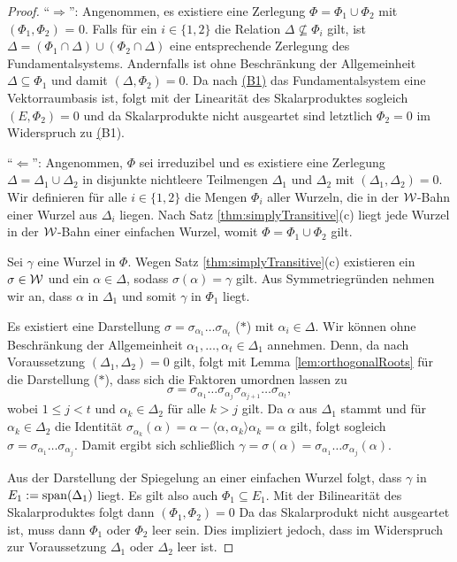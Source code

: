 \begin{proof}
  ``$\Rightarrow$'':
  Angenommen, es existiere eine Zerlegung $\Phi = \Phi_1 \cup \Phi_2$ mit $(\Phi_1, \Phi_2)$ = 0.
  Falls für ein $i \in \{1,2\}$ die Relation $\Delta \not\subseteq \Phi_i$ gilt, ist $\Delta = (\Phi_1 \cap \Delta) \cup (\Phi_2 \cap \Delta)$ eine entsprechende Zerlegung des Fundamentalsystems.
  Andernfalls ist ohne Beschränkung der Allgemeinheit $\Delta \subseteq \Phi_1$ und damit $(\Delta, \Phi_2) = 0$.
  Da nach \hyperref[it:B1]{(B1)} das Fundamentalsystem eine Vektorraumbasis ist, folgt mit der Linearität des Skalarproduktes sogleich $(E, \Phi_2) = 0$ und da Skalarprodukte nicht ausgeartet sind letztlich $\Phi_2 = {0}$ im Widerspruch zu \hyperref[it:B1](B1).

  ``$\Leftarrow$'':
  Angenommen, $\Phi$ sei irreduzibel und es existiere eine Zerlegung $\Delta = \Delta_1 \cup \Delta_2$ in disjunkte nichtleere Teilmengen $\Delta_1$ und $\Delta_2$ mit $(\Delta_1, \Delta_2) = 0$.
  Wir definieren für alle $i \in \{1,2\}$ die Mengen $\Phi_i$ aller Wurzeln, die in der $\mathcal{W}$\hyp{}Bahn einer Wurzel aus $\Delta_i$ liegen. 
  Nach Satz \ref{thm:simplyTransitive}(c) liegt jede Wurzel in der $\mathcal{W}$\hyp{}Bahn einer einfachen Wurzel, womit $\Phi = \Phi_1 \cup \Phi_2$ gilt.

  Sei $\gamma$ eine Wurzel in $\Phi$.
  Wegen Satz \ref{thm:simplyTransitive}(c) existieren ein $\sigma \in \mathcal{W}$ und ein $\alpha \in \Delta$, sodass $\sigma(\alpha) = \gamma$ gilt.
  Aus Symmetriegründen nehmen wir an, dass $\alpha$ in $\Delta_1$ und somit $\gamma$ in $\Phi_1$ liegt.

  Es existiert eine Darstellung $\sigma = \sigma_{\alpha_1} \dots \sigma_{\alpha_t}$ ($\ast$) mit $\alpha_i \in \Delta$.
  Wir können ohne Beschränkung der Allgemeinheit $\alpha_1,\dots,\alpha_t \in \Delta_1$ annehmen.
  Denn, da nach Voraussetzung $(\Delta_1, \Delta_2) = 0$ gilt, folgt mit Lemma \ref{lem:orthogonalRoots} für die Darstellung ($\ast$), dass sich die Faktoren umordnen lassen zu
  \begin{displaymath}
    \sigma = \sigma_{\alpha_1} \dots \sigma_{\alpha_j} \sigma_{\alpha_{j+1}} \dots \sigma_{\alpha_t},
  \end{displaymath}
  wobei $1 \leq j < t$ und $\alpha_k \in \Delta_2$ für alle $k > j$ gilt.
  Da $\alpha$ aus $\Delta_1$ stammt und für $\alpha_k \in \Delta_2$ die Identität $\sigma_{\alpha_k}(\alpha) = \alpha - \langle \alpha, \alpha_k \rangle \alpha_k = \alpha$ gilt, folgt sogleich $\sigma = \sigma_{\alpha_1} \dots \sigma_{\alpha_j}$. 
  Damit ergibt sich schließlich $\gamma = \sigma(\alpha) = \sigma_{\alpha_1} \dots \sigma_{\alpha_j}(\alpha)$.

  Aus der Darstellung der Spiegelung an einer einfachen Wurzel folgt, dass $\gamma$ in $E_1 := \operatorname{span}(\Delta_1)$ liegt.
  Es gilt also auch $\Phi_1 \subseteq E_1$.
  Mit der Bilinearität des Skalarproduktes folgt dann $(\Phi_1, \Phi_2) = 0$
  Da das Skalarprodukt nicht ausgeartet ist, muss dann $\Phi_1$ oder $\Phi_2$ leer sein.
  Dies impliziert jedoch, dass im Widerspruch zur Voraussetzung $\Delta_1$ oder $\Delta_2$ leer ist.
\end{proof}

